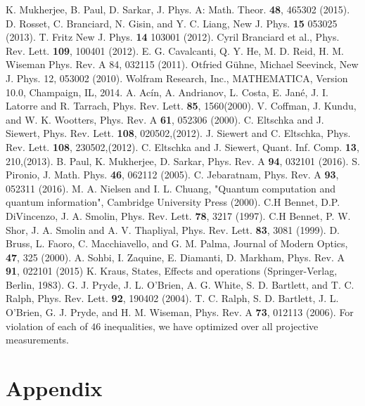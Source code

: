 \documentclass[pra,10pt,twocolumn,superscriptaddress,floatfix,showpacs]{revtex4-1}
\begin{document}
\begin{thebibliography}{1}
 K. Mukherjee, B. Paul, D. Sarkar, J. Phys. A: Math. Theor. \textbf{48}, 465302 (2015).
 D. Rosset, C. Branciard, N. Gisin, and Y. C. Liang, New J. Phys. \textbf{15} 053025 (2013).
 T. Fritz New J. Phys. \textbf{14} 103001 (2012).
 Cyril Branciard et al., Phys. Rev. Lett. \textbf{109}, 100401 (2012).
 E. G. Cavalcanti, Q. Y. He, M. D. Reid, H. M. Wiseman	Phys. Rev. A 84, 032115 (2011).
 Otfried Gühne, Michael Seevinck, New J. Phys. 12, 053002 (2010).
 Wolfram Research, Inc., MATHEMATICA, Version 10.0, Champaign, IL, 2014.
 A. Acín, A. Andrianov, L. Costa, E. Jané, J. I. Latorre and R. Tarrach, Phys. Rev. Lett. \textbf{85}, 1560(2000).
 V. Coffman, J. Kundu, and W. K. Wootters, Phys. Rev. A \textbf{61}, 052306 (2000).
 C. Eltschka and J. Siewert, Phys. Rev. Lett. \textbf{108}, 020502,(2012).
 J. Siewert and C. Eltschka, Phys. Rev. Lett. \textbf{108}, 230502,(2012).
 C. Eltschka and J. Siewert, Quant. Inf. Comp. \textbf{13}, 210,(2013).
 B. Paul, K. Mukherjee, D. Sarkar, Phys. Rev. A \textbf{94}, 032101 (2016).
S. Pironio, J. Math. Phys. \textbf{46}, 062112 (2005).
 C. Jebaratnam, Phys. Rev. A \textbf{93}, 052311 (2016).
 M. A. Nielsen and I. L. Chuang, "Quantum computation and quantum information", Cambridge University Press (2000).
 C.H Bennet, D.P. DiVincenzo, J. A. Smolin, Phys. Rev. Lett. \textbf{78}, 3217 (1997).
 C.H Bennet, P. W. Shor, J. A. Smolin and A. V. Thapliyal, Phys. Rev. Lett. \textbf{83}, 3081 (1999).
 D. Bruss, L. Faoro, C. Macchiavello, and G. M. Palma, Journal of Modern Optics, \textbf{47}, 325 (2000).
A. Sohbi, I. Zaquine, E. Diamanti, D. Markham, Phys. Rev. A \textbf{91}, 022101 (2015)
 K. Kraus, States, Effects and operations (Springer-Verlag, Berlin, 1983).
 G. J. Pryde, J. L. O’Brien, A. G. White, S. D. Bartlett, and T. C. Ralph, Phys. Rev. Lett. \textbf{92}, 190402 (2004).
 T. C. Ralph, S. D. Bartlett, J. L. O’Brien, G. J. Pryde, and H. M.
Wiseman, Phys. Rev. A \textbf{73}, 012113 (2006).
For violation of each of $46$ inequalities, we have optimized over all projective measurements.
\end{thebibliography}

\section{Appendix}
\end{document}
